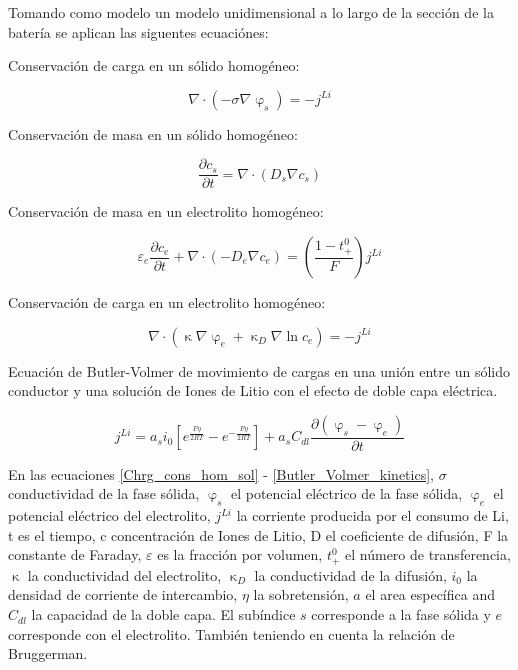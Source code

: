\documentclass[10pt,a4paper]{article}
\begin{document}
	Tomando como modelo un modelo unidimensional a lo largo de la sección de la batería se aplican las siguentes ecuaciónes:

	\vspace{5mm}
	
	Conservación de carga en un sólido homogéneo:

	\begin{equation}
		\nabla \cdot (-\sigma\nabla\upvarphi_s)=-j^{Li} 
		\label{Chrg_cons_hom_sol}
	\end{equation}	
	
	Conservación de masa en un sólido homogéneo:

	\begin{equation}
		\frac{\partial c_s}{\partial t}=\nabla \cdot (D_s\nabla c_s) 
		\label{Mass_cons_hom_sol}
	\end{equation}	
	
	Conservación de masa en un electrolito homogéneo:
	
	\begin{equation}
		\varepsilon_e\frac{\partial c_e}{\partial t} + \nabla \cdot (-D_e\nabla c_e) = (\frac{1-t_+^0}{F})j^{Li}
		\label{Mass_cons_hom_electrolyte}
	\end{equation}	

	Conservación de carga en un electrolito homogéneo:
	
	\begin{equation}
		\nabla \cdot (\upkappa \nabla \upvarphi_e + \upkappa_D \nabla \ln c_e) = -j^{Li}
		\label{Chrg_cons_hom_electrolyte}
	\end{equation}	
	
	Ecuación de Butler-Volmer de movimiento de cargas en una unión entre un sólido conductor y una solución de Iones de Litio con el efecto de doble capa eléctrica.
	
	\begin{equation}
		j^{Li} = a_si_0[{e^\frac{F\eta}{2RT}-e^{-\frac{F\eta}{2RT}}}]+ a_sC_{dl}\frac{\partial{(\upvarphi_s - \upvarphi_e)}}{\partial t}
		\label{Butler_Volmer_kinetics}
	\end{equation}	
	
	En las ecuaciones \ref{Chrg_cons_hom_sol} - \ref{Butler_Volmer_kinetics}, $\sigma$  conductividad de la fase sólida, $\upvarphi_s$ el potencial eléctrico de la fase sólida, $\upvarphi_e$ el potencial eléctrico del electrolito, $j^{Li}$ la corriente producida por el consumo de Li, t es el tiempo, c concentración de Iones de Litio, D el coeficiente de difusión, F la constante de Faraday, $\varepsilon$ es la fracción por volumen,
	$t_+^0$ el número de transferencia, $\upkappa$ la conductividad del electrolito,
	$\upkappa_D$ la conductividad de la difusión, $i_0$ la densidad de corriente de intercambio, $\eta$ la sobretensión, $a$ el area específica and $C_{dl}$ la capacidad de la doble capa. El subíndice $s$ corresponde a la fase sólida y $e$ corresponde con el electrolito. También teniendo en cuenta la relación de Bruggerman.
\end{document}
